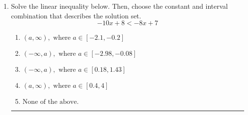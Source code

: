 \documentclass[14pt]{extbook}
\newcommand{\litem}[1]{\item#1\hspace*{-1cm}\rule{\textwidth}{0.4pt}}
\begin{document}
\begin{enumerate}
{\begin{enumerate}[label=\Alph*.]
\end{enumerate} }
\litem{
Solve the linear inequality below. Then, choose the constant and interval combination that describes the solution set.\[ -10x + 8 < -8x + 7 \]\begin{enumerate}[label=\Alph*.]
\item \( (a, \infty), \text{ where } a \in [-2.1, -0.2] \)
\item \( (-\infty, a), \text{ where } a \in [-2.98, -0.08] \)
\item \( (-\infty, a), \text{ where } a \in [0.18, 1.43] \)
\item \( (a, \infty), \text{ where } a \in [0.4, 4] \)
\item \( \text{None of the above}. \)

\end{enumerate} }
\end{enumerate}
\end{document}
